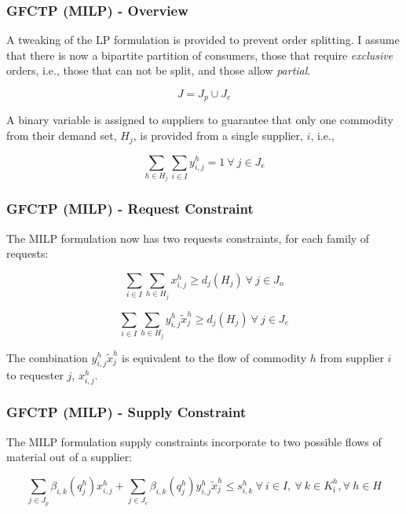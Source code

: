 \begin{frame}[ctb!]
  \frametitle{GFCTP (MILP) - Overview}

  A tweaking of the LP formulation is provided to prevent order splitting. I
  assume that there is now a bipartite partition of consumers, those that
  require \textit{exclusive} orders, i.e., those that can not be split, and
  those allow \textit{partial}.

  \begin{equation}\label{eqs:consumer-union}
    J = J_{p} \cup J_{e}
  \end{equation}

  A binary variable is assigned to suppliers to guarantee that only one
  commodity from their demand set, $H_j$, is provided from a single supplier,
  $i$, i.e.,

  \begin{equation}
    \sum_{h \in H_j}\sum_{i \in I} y_{i,j}^{h} = 1
     \: \forall \: j \in J_{e}
  \end{equation}
  
\end{frame}

\begin{frame}[ctb!]
  \frametitle{GFCTP (MILP) - Request Constraint} 

  The MILP formulation now has two requests constraints, for each family of
  requests:

  \begin{equation}
    \sum_{i \in I}\sum_{h \in H_{j}} x_{i,j}^{h} \geq d_{j}(H_{j})
     \: \forall \: j \in J_{o}
  \end{equation}
  
  \begin{equation}    
    \sum_{i \in I}\sum_{h \in H_{j}} y_{i,j}^{h} \tilde{x}_{j}^{h} \geq d_{j}(H_{j}) 
     \: \forall \: j \in J_{e}
  \end{equation}

  The combination $y_{i,j}^{h} \tilde{x}_{j}^{h}$ is equivalent to the flow of
  commodity $h$ from supplier $i$ to requester $j$, $x^h_{i,j}$.
\end{frame}

\begin{frame}[ctb!]
  \frametitle{GFCTP (MILP) - Supply Constraint} 

  The MILP formulation supply constraints incorporate to two possible flows of
  material out of a supplier:
  
  \begin{equation}    
    \sum_{j \in J_{p}}\beta_{i,k}(q_{j}^{h}) x_{i,j}^{h}
    + \sum_{j \in J_{e}}\beta_{i,k}(q_{j}^{h}) y_{i,j}^{h} \tilde{x}_{j}^{h} \leq s_{i,k}^{h}
     \: \forall \: i \in I, \: \forall \: k \in K_{i}^{h}, \forall \: {h \in H}
  \end{equation}
  
\end{frame}

